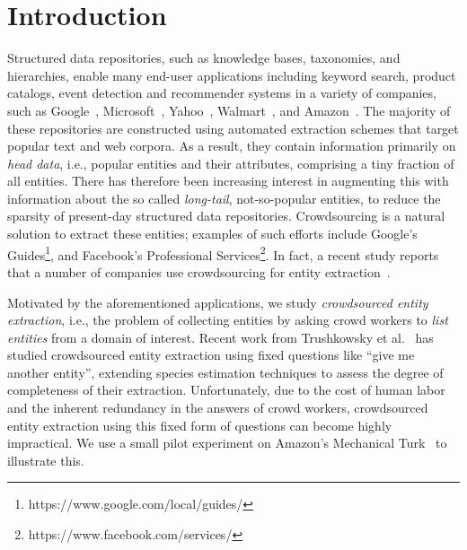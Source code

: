 
\section{Introduction}
\label{sec:intro}
Structured data repositories, such as knowledge bases, taxonomies, and hierarchies, enable many end-user applications including keyword search, product catalogs, event detection and recommender systems in a variety of companies, such as Google~\cite{singhal2012introducing}, Microsoft~\cite{cheng2010fuzzy}, Yahoo~\cite{woo},
Walmart~\cite{Deshpande:2013:BMU:2463676.2465297}, and Amazon~\cite{amazon-product}. The majority of these repositories are constructed using automated extraction schemes that target popular text and web corpora. As a result, they contain information primarily on {\em head data}, i.e., popular entities and their attributes, 
comprising a tiny fraction of all entities.
There has therefore been increasing interest
in augmenting this 
with information about the so called {\em long-tail},
not-so-popular entities, to reduce the sparsity of present-day structured
data repositories.
Crowdsourcing is 
a natural solution to extract these entities;
examples of such efforts include Google's Guides\footnote{https://www.google.com/local/guides/}, and Facebook's Professional Services\footnote{https://www.facebook.com/services/}. In fact, 
a recent study reports that a number of companies use
crowdsourcing for entity extraction~\cite{DBS-044}.

Motivated by the aforementioned applications, 
we study {\em crowdsourced entity extraction}, i.e., 
the problem of collecting entities 
by asking crowd workers to {\em list entities} 
from a domain of interest. 
Recent work from Trushkowsky 
et al.~\cite{trushkowsky:2013,DBLP:journals/cacm/TrushkowskyKS16} 
has studied crowdsourced entity extraction using fixed questions like ``give me another entity'', extending species 
estimation techniques to assess the degree of completeness
of their extraction. 
Unfortunately, due to the cost of human labor and the inherent redundancy in the answers of crowd workers, crowdsourced entity extraction using this fixed form of questions
can become highly impractical. 
We use a small pilot experiment on Amazon's Mechanical Turk~\cite{mturk} to illustrate this. 

